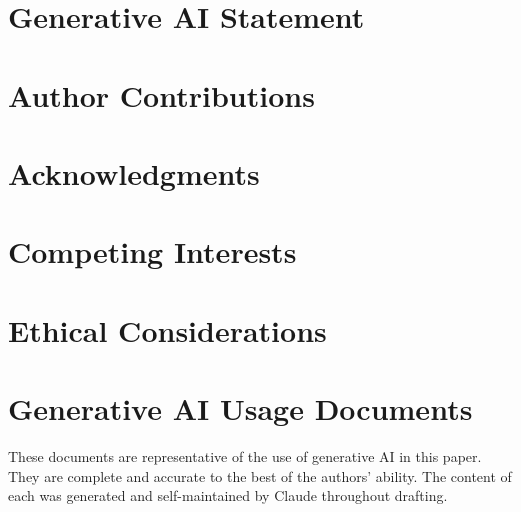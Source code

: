 \documentclass{article}
\begin{document}


\section*{Generative AI Statement}



\section*{Author Contributions}



\section*{Acknowledgments}



\section*{Competing Interests}



\section*{Ethical Considerations}






\appendix
\section{Generative AI Usage Documents}\label{app:genai}
These documents are representative of the use of generative AI in this paper. They are complete and accurate to the best of the authors' ability. The content of each was generated and self-maintained by Claude throughout drafting.


\end{document}
